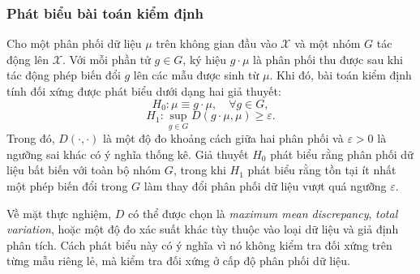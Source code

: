 \subsubsection{Phát biểu bài toán kiểm định}

Cho một phân phối dữ liệu $\mu$ trên không gian đầu vào $\mathcal{X}$ và một nhóm $G$ tác động lên $\mathcal{X}$. Với mỗi phần tử $g \in G$, ký hiệu $g \cdot \mu$ là phân phối thu được sau khi tác động phép biến đổi $g$ lên các mẫu được sinh từ $\mu$. Khi đó, bài toán kiểm định tính đối xứng được phát biểu dưới dạng hai giả thuyết:
\begin{equation}
    H_0: \mu \equiv g \cdot \mu, \quad \forall g \in G,
    \label{eq:symmetry-testing-null}
\end{equation}
\begin{equation}
    H_1: \sup_{g \in G} D(g \cdot \mu, \mu) \geq \varepsilon.
    \label{eq:symmetry-testing-alternative}
\end{equation}
Trong đó, $D(\cdot,\cdot)$ là một độ đo khoảng cách giữa hai phân phối và $\varepsilon > 0$ là ngưỡng sai khác có ý nghĩa thống kê. Giả thuyết $H_0$ phát biểu rằng phân phối dữ liệu bất biến với toàn bộ nhóm $G$, trong khi $H_1$ phát biểu rằng tồn tại ít nhất một phép biến đổi trong $G$ làm thay đổi phân phối dữ liệu vượt quá ngưỡng $\varepsilon$.

Về mặt thực nghiệm, $D$ có thể được chọn là \textit{maximum mean discrepancy}, \textit{total variation}, hoặc một độ đo xác suất khác tùy thuộc vào loại dữ liệu và giả định phân tích. Cách phát biểu này có ý nghĩa vì nó không kiểm tra đối xứng trên từng mẫu riêng lẻ, mà kiểm tra đối xứng ở cấp độ phân phối dữ liệu.

